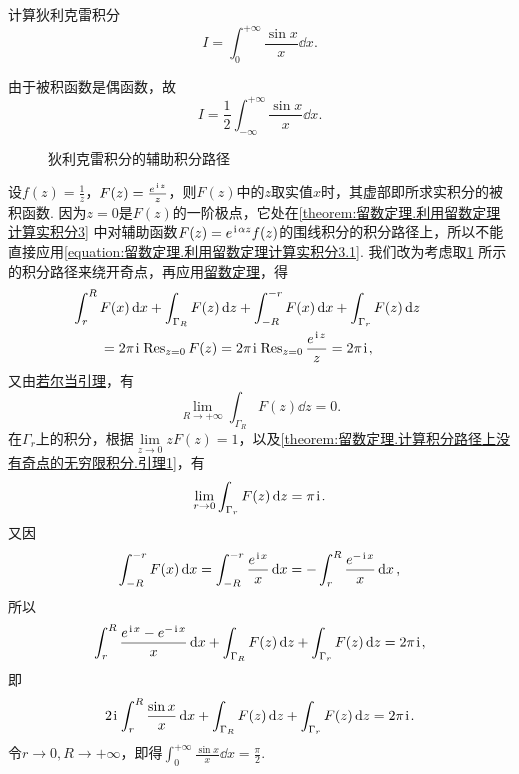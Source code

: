 \begin{example}
计算狄利克雷积分\[
I = \int_0^{+\infty} \frac{\sin x}{x} \dd{x}.
\]
\begin{solution}
由于被积函数是偶函数，故\[
I = \frac{1}{2} \int_{-\infty}^{+\infty} \frac{\sin x}{x} \dd{x}.
\]

\begin{figure}[ht]
\centering
{}
\caption{狄利克雷积分的辅助积分路径}
\label{figure:留数定理.狄利克雷积分的辅助积分路径}
\end{figure}

设\(f(z) = \frac{1}{z}\)，\(F(z) = \frac{e^{\kern1pt\mathrm{i}\kern1pt z}}{z}\)，则\(F(z)\)中的\(z\)取实值\(x\)时，其虚部即所求实积分的被积函数.
因为\(z=0\)是\(F(z)\)的一阶极点，它处在\cref{theorem:留数定理.利用留数定理计算实积分3} 中对辅助函数\(F(z) = e^{\kern1pt\mathrm{i}\kern1pt\alpha z} f(z)\)的围线积分的积分路径上，所以不能直接应用\cref{equation:留数定理.利用留数定理计算实积分3.1}.
我们改为考虑取\cref{figure:留数定理.狄利克雷积分的辅助积分路径} 所示的积分路径来绕开奇点，再应用\hyperref[theorem:留数定理.柯西留数定理]{留数定理}，得\[
\begin{split}
&\hspace{-20pt}\int_r^R F(x) \dd{x}
+ \int_{\Gamma_R} F(z) \dd{z}
+ \int_{-R}^{-r} F(x) \dd{x}
+ \int_{\Gamma_r} F(z) \dd{z} \\
&= 2\pi\iu \Res_{z=0} F(z)
= 2\pi\iu \Res_{z=0} \frac{e^{\iu z}}{z}
= 2\pi\iu,
\end{split}
\]又由\hyperref[theorem:留数定理.计算积分路径上没有奇点的无穷限积分.引理2]{若尔当引理}，有\[
\lim\limits_{R\to+\infty} \int_{\Gamma_R} F(z) \dd{z} = 0.
\]在\(\Gamma_r\)上的积分，根据\(\lim\limits_{z\to0} z F(z) = 1\)，以及\cref{theorem:留数定理.计算积分路径上没有奇点的无穷限积分.引理1}，有\[
\lim\limits_{r\to0} \int_{\Gamma_r} F(z) \dd{z} = \pi\kern1pt\mathrm{i}\kern1pt.
\]又因\[
\int_{-R}^{-r} F(x) \dd{x}
= \int_{-R}^{-r} \frac{e^{\kern1pt\mathrm{i}\kern1pt x}}{x} \dd{x}
= -\int_r^R \frac{e^{-\kern1pt\mathrm{i}\kern1pt x}}{x} \dd{x},
\]所以\[
\int_r^R \frac{e^{\kern1pt\mathrm{i}\kern1pt x} - e^{-\kern1pt\mathrm{i}\kern1pt x}}{x} \dd{x}
+ \int_{\Gamma_R} F(z) \dd{z}
+ \int_{\Gamma_r} F(z) \dd{z}
= 2\pi\kern1pt\mathrm{i}\kern1pt,
\]即\[
2\kern1pt\mathrm{i}\kern1pt \int_r^R \frac{\sin x}{x} \dd{x}
+ \int_{\Gamma_R} F(z) \dd{z}
+ \int_{\Gamma_r} F(z) \dd{z}
= 2\pi\kern1pt\mathrm{i}\kern1pt.
\]令\(r\to0, R\to+\infty\)，即得\(\int_0^{+\infty} \frac{\sin x}{x} \dd{x} = \frac{\pi}{2}\).
\end{solution}
\end{example}

